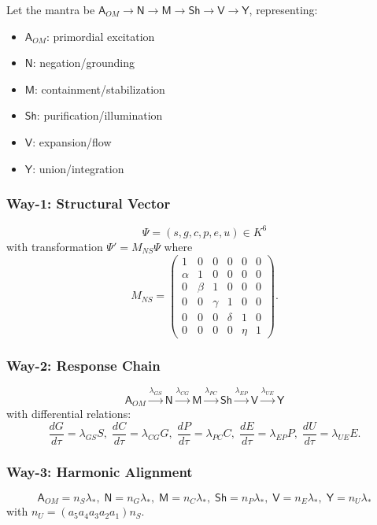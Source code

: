 \documentclass[12pt, reqno]{amsart}
\theoremstyle{plain}
\theoremstyle{definition}
\theoremstyle{remark}
\newcommand{\lstar}{\lambda_{*}}
\newcommand{\OM}{\mathsf{A}_{OM}}
\newcommand{\NA}{\mathsf{N}}
\newcommand{\MA}{\mathsf{M}}
\newcommand{\SHI}{\mathsf{Sh}}
\newcommand{\VA}{\mathsf{V}}
\newcommand{\YA}{\mathsf{Y}}
\begin{document}
Let the mantra be $\OM \to \NA \to \MA \to \SHI \to \VA \to \YA$, representing:
\begin{itemize}
    \item $\OM$: primordial excitation
    \item $\NA$: negation/grounding
    \item $\MA$: containment/stabilization
    \item $\SHI$: purification/illumination
    \item $\VA$: expansion/flow
    \item $\YA$: union/integration
\end{itemize}

\subsubsection{Way-1: Structural Vector}

\[
\Psi = (s,g,c,p,e,u) \in K^6
\]
with transformation $\Psi' = M_{NS}\Psi$ where
\[
M_{NS} = \begin{pmatrix}
1 & 0 & 0 & 0 & 0 & 0 \\
\alpha & 1 & 0 & 0 & 0 & 0 \\
0 & \beta & 1 & 0 & 0 & 0 \\
0 & 0 & \gamma & 1 & 0 & 0 \\
0 & 0 & 0 & \delta & 1 & 0 \\
0 & 0 & 0 & 0 & \eta & 1
\end{pmatrix}.
\]

\subsubsection{Way-2: Response Chain}

\[
\OM \xrightarrow{\lambda_{GS}} \NA \xrightarrow{\lambda_{CG}} \MA \xrightarrow{\lambda_{PC}} \SHI
\xrightarrow{\lambda_{EP}} \VA \xrightarrow{\lambda_{UE}} \YA
\]
with differential relations:
\[
\frac{dG}{d\tau} = \lambda_{GS}S,\; \frac{dC}{d\tau} = \lambda_{CG}G,\; \frac{dP}{d\tau} = \lambda_{PC}C,\;
\frac{dE}{d\tau} = \lambda_{EP}P,\; \frac{dU}{d\tau} = \lambda_{UE}E.
\]

\subsubsection{Way-3: Harmonic Alignment}

\[
\OM = n_S\lstar,\; \NA = n_G\lstar,\; \MA = n_C\lstar,\; \SHI = n_P\lstar,\; \VA = n_E\lstar,\; \YA = n_U\lstar
\]
with $n_U = (a_5a_4a_3a_2a_1)n_S$.
\end{document}
